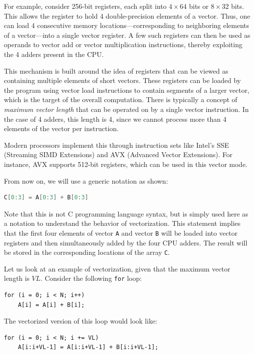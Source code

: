\documentclass[12pt]{book}
\begin{document}
For example, consider 256-bit registers, each split into $4 \times 64$ bits or $8 \times 32$ bits. This allows the register to hold 4 double-precision elements of a vector. Thus, one can load 4 consecutive memory locations—corresponding to neighboring elements of a vector—into a single vector register. A few such registers can then be used as operands to vector add or vector multiplication instructions, thereby exploiting the 4 adders present in the CPU.

This mechanism is built around the idea of registers that can be viewed as containing multiple elements of short vectors. These registers can be loaded by the program using vector load instructions to contain segments of a larger vector, which is the target of the overall computation. There is typically a concept of \textit{maximum vector length} that can be operated on by a single vector instruction. In the case of 4 adders, this length is 4, since we cannot process more than 4 elements of the vector per instruction.

Modern processors implement this through instruction sets like Intel’s SSE (Streaming SIMD Extensions) and AVX (Advanced Vector Extensions). For instance, AVX supports 512-bit registers, which can be used in this vector mode.

From now on, we will use a generic notation as shown:
\begin{lstlisting}[language=C++]
C[0:3] = A[0:3] + B[0:3]
\end{lstlisting}

Note that this is not C programming language syntax, but is simply used here as a notation to understand the behavior of vectorization. This statement implies that the first four elements of vector \texttt{A} and vector \texttt{B} will be loaded into vector registers and then simultaneously added by the four CPU adders. The result will be stored in the corresponding locations of the array \texttt{C}.

Let us look at an example of vectorization, given that the maximum vector length is $VL$. Consider the following \texttt{for} loop:

\begin{lstlisting}
for (i = 0; i < N; i++)
    A[i] = A[i] + B[i];
\end{lstlisting}

The vectorized version of this loop would look like:

\begin{lstlisting}
for (i = 0; i < N; i += VL)
    A[i:i+VL-1] = A[i:i+VL-1] + B[i:i+VL-1];
\end{lstlisting}
\end{document}
